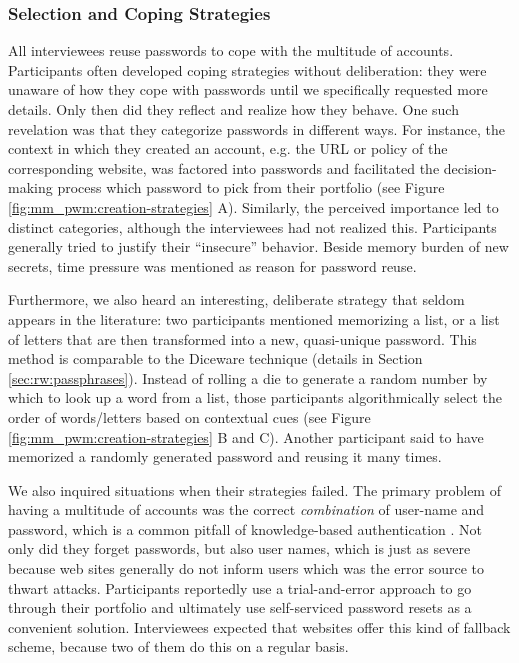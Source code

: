 \subsubsection{Selection and Coping Strategies}
All interviewees reuse passwords to cope with the multitude of accounts. Participants often developed coping strategies without deliberation: they were unaware of how they cope with passwords until we specifically requested more details. Only then did they reflect and realize how they behave. One such revelation was that they categorize passwords in different ways. For instance, the context in which they created an account, e.g. the URL or policy of the corresponding website, was factored into passwords and facilitated the decision-making process which password to pick from their portfolio (see Figure \ref{fig:mm_pwm:creation-strategies} A). Similarly, the perceived importance led to distinct categories, although the interviewees had not realized this. Participants generally tried to justify their ``insecure'' behavior. Beside memory burden of new secrets, time pressure was mentioned as reason for password reuse. 

Furthermore, we also heard an interesting, deliberate strategy that seldom appears in the literature: two participants mentioned memorizing a list, or a list of letters that are then transformed into a new, quasi-unique password. This method is comparable to the Diceware technique (details in Section \ref{sec:rw:passphrases}). Instead of rolling a die to generate a random number by which to look up a word from a list, those participants algorithmically select the order of words/letters based on contextual cues (see Figure \ref{fig:mm_pwm:creation-strategies} B and C). Another participant said to have memorized a randomly generated password and reusing it many times. 

We also inquired situations when their strategies failed. The primary problem of having a multitude of accounts was the correct \textit{combination} of user-name and password, which is a common pitfall of knowledge-based authentication \cite{Stobert2014PasswordLifeCycle}. Not only did they forget passwords, but also user names, which is just as severe because web sites generally do not inform users which was the error source to thwart attacks. Participants reportedly use a trial-and-error approach to go through their portfolio and ultimately use self-serviced password resets as a convenient solution. Interviewees expected that websites offer this kind of fallback scheme, because two of them do this on a regular basis. 

